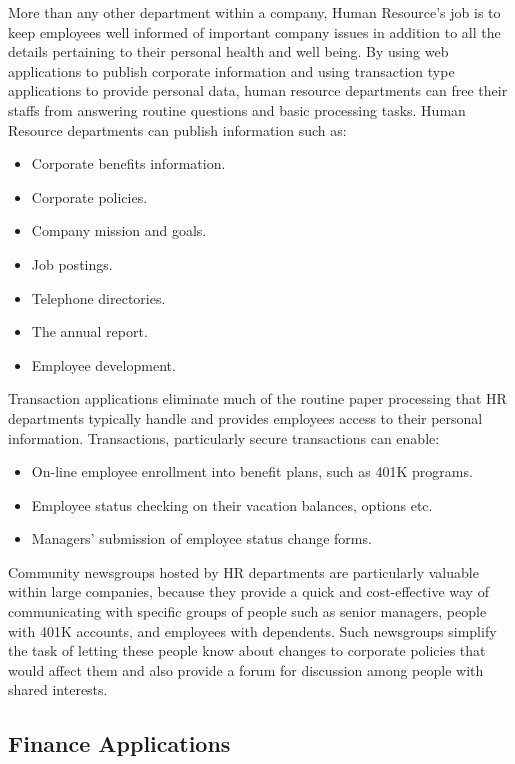 More than any other department within a company, Human Resource's job
is to keep employees well informed of important company issues in
addition to all the details pertaining to their personal health and
well being. By using web applications to publish corporate information
and using transaction type applications to provide personal data, human
resource departments can free their staffs from answering routine
questions and basic processing tasks. Human Resource departments can
publish information such as:
\begin{itemize}
  \item Corporate benefits information.
  \item Corporate policies.
  \item Company mission and goals.
  \item Job postings.
  \item Telephone directories.
  \item The annual report.
  \item Employee development.
\end{itemize}

Transaction applications eliminate much of the routine paper processing
that HR departments typically handle and provides employees access to
their personal information. Transactions, particularly secure
transactions can enable:
\begin{itemize}
  \item On-line employee enrollment into benefit plans, such as 401K
programs.
  \item Employee status checking on their vacation balances, options etc.
  \item Managers' submission of employee status change forms.
\end{itemize}

Community newsgroups hosted by HR departments are particularly valuable
within large companies, because they provide a quick and cost-effective
way of communicating with specific groups of people such as senior
managers, people with 401K accounts, and employees with dependents.
Such newsgroups simplify the task of letting these people know about
changes to corporate policies that would affect them and also provide a
forum for discussion among people with shared interests.

\subsection{Finance Applications}

